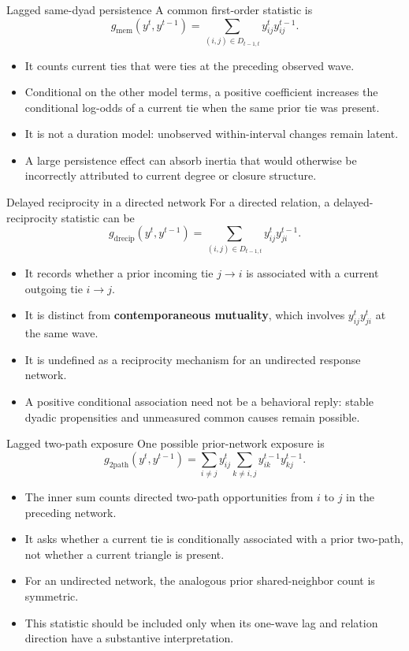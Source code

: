 \documentclass[aspectratio=169,11pt]{beamer}
\newcommand{\term}[1]{\textbf{\color{nupurple}#1}}
\begin{document}
\begin{frame}{Lagged same-dyad persistence}
A common first-order statistic is
\[
g_{\mathrm{mem}}(y^t,y^{t-1})=\sum_{(i,j)\in D_{t-1,t}} y_{ij}^{t}y_{ij}^{t-1}.
\]
\begin{itemize}
\item It counts current ties that were ties at the preceding observed wave.
\item Conditional on the other model terms, a positive coefficient increases the conditional log-odds of a current tie when the same prior tie was present.
\item It is not a duration model: unobserved within-interval changes remain latent.
\item A large persistence effect can absorb inertia that would otherwise be incorrectly attributed to current degree or closure structure.
\end{itemize}
\end{frame}

\begin{frame}{Delayed reciprocity in a directed network}
For a directed relation, a delayed-reciprocity statistic can be
\[
g_{\mathrm{drecip}}(y^t,y^{t-1})=\sum_{(i,j)\in D_{t-1,t}} y_{ij}^{t}y_{ji}^{t-1}.
\]
\begin{itemize}
\item It records whether a prior incoming tie $j\to i$ is associated with a current outgoing tie $i\to j$.
\item It is distinct from \term{contemporaneous mutuality}, which involves $y_{ij}^{t}y_{ji}^{t}$ at the same wave.
\item It is undefined as a reciprocity mechanism for an undirected response network.
\item A positive conditional association need not be a behavioral reply: stable dyadic propensities and unmeasured common causes remain possible.
\end{itemize}
\end{frame}

\begin{frame}{Lagged two-path exposure}
One possible prior-network exposure is
\[
g_{\mathrm{2path}}(y^t,y^{t-1})=
\sum_{i\ne j}y_{ij}^{t}\sum_{k\ne i,j}y_{ik}^{t-1}y_{kj}^{t-1}.
\]
\begin{itemize}
\item The inner sum counts directed two-path opportunities from $i$ to $j$ in the preceding network.
\item It asks whether a current tie is conditionally associated with a prior two-path, not whether a current triangle is present.
\item For an undirected network, the analogous prior shared-neighbor count is symmetric.
\item This statistic should be included only when its one-wave lag and relation direction have a substantive interpretation.
\end{itemize}
\end{frame}
\end{document}
